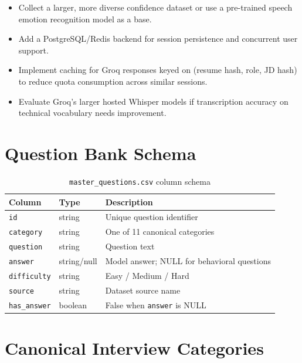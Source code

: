 \documentclass[12pt,a4paper]{article}
\begin{document}
\begin{itemize}[leftmargin=1.5em]
  \item Collect a larger, more diverse confidence dataset or use a pre-trained speech emotion recognition model as a base.
  \item Add a PostgreSQL/Redis backend for session persistence and concurrent user support.
  \item Implement caching for Groq responses keyed on (resume hash, role, JD hash) to reduce quota consumption across similar sessions.
  \item Evaluate Groq's larger hosted Whisper models if transcription accuracy on technical vocabulary needs improvement.
\end{itemize}

\appendix

\section{Question Bank Schema}

\begin{table}[H]
\centering
\caption{\texttt{master\_questions.csv} column schema}
\small
\begin{tabular}{l l l}
\toprule
\textbf{Column} & \textbf{Type} & \textbf{Description} \\
\midrule
\texttt{id} & string & Unique question identifier \\
\texttt{category} & string & One of 11 canonical categories \\
\texttt{question} & string & Question text \\
\texttt{answer} & string/null & Model answer; NULL for behavioral questions \\
\texttt{difficulty} & string & Easy / Medium / Hard \\
\texttt{source} & string & Dataset source name \\
\texttt{has\_answer} & boolean & False when \texttt{answer} is NULL \\
\bottomrule
\end{tabular}
\end{table}

\section{Canonical Interview Categories}
\end{document}
